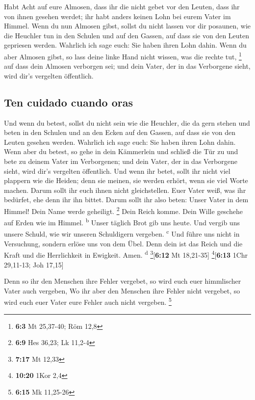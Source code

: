  Habt Acht auf eure Almosen, dass ihr die nicht gebet vor
den Leuten, dass ihr von ihnen gesehen werdet; ihr habt anders keinen
Lohn bei eurem Vater im Himmel.  Wenn du nun Almosen
gibst, sollst du nicht lassen vor dir posaunen, wie die Heuchler tun in
den Schulen und auf den Gassen, auf dass sie von den Leuten gepriesen
werden. Wahrlich ich sage euch: Sie haben ihren Lohn dahin.
 Wenn du aber Almosen gibst, so lass deine linke Hand
nicht wissen, was die rechte tut, \footnote{\textbf{6:3} Mt 25,37-40;
  Röm 12,8}  auf dass dein Almosen verborgen sei; und dein
Vater, der in das Verborgene sieht, wird dir's vergelten öffentlich.

\hypertarget{ten-cuidado-cuando-oras}{%
\subsection{Ten cuidado cuando oras}\label{ten-cuidado-cuando-oras}}

 Und wenn du betest, sollst du nicht sein wie die
Heuchler, die da gern stehen und beten in den Schulen und an den Ecken
auf den Gassen, auf dass sie von den Leuten gesehen werden. Wahrlich ich
sage euch: Sie haben ihren Lohn dahin.  Wenn aber du
betest, so gehe in dein Kämmerlein und schließ die Tür zu und bete zu
deinem Vater im Verborgenen; und dein Vater, der in das Verborgene
sieht, wird dir's vergelten öffentlich.  Und wenn ihr
betet, sollt ihr nicht viel plappern wie die Heiden; denn sie meinen,
sie werden erhört, wenn sie viel Worte machen.  Darum
sollt ihr euch ihnen nicht gleichstellen. Euer Vater weiß, was ihr
bedürfet, ehe denn ihr ihn bittet.  Darum sollt ihr also
beten: Unser Vater in dem Himmel! Dein Name werde geheiligt. \footnote{\textbf{6:9}
  Hes 36,23; Lk 11,2-4}  Dein Reich komme. Dein Wille
geschehe auf Erden wie im Himmel. \textsuperscript{b} 
Unser täglich Brot gib uns heute.  Und vergib uns unsere
Schuld, wie wir unseren Schuldigern vergeben. \textsuperscript{c}
 Und führe uns nicht in Versuchung, sondern erlöse uns
von dem Übel. Denn dein ist das Reich und die Kraft und die Herrlichkeit
in Ewigkeit. Amen. \textsuperscript{d} \footnote{\textbf{7:17} Mt 12,33}{[}\textbf{6:12}
Mt 18,21-35{]} \footnote{\textbf{10:20} 1Kor 2,4}{[}\textbf{6:13} 1Chr
29,11-13; Joh 17,15{]}

 Denn so ihr den Menschen ihre Fehler vergebet, so wird
euch euer himmlischer Vater auch vergeben,  Wo ihr aber
den Menschen ihre Fehler nicht vergebet, so wird euch euer Vater eure
Fehler auch nicht vergeben. \footnote{\textbf{6:15} Mk 11,25-26}

